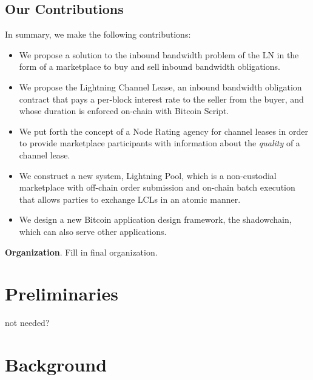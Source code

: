 \documentclass[10pt,a4paper]{article}
\theoremstyle{definition}
\begin{document}
\subsection{Our Contributions}

In summary, we make the following contributions: 

\begin{itemize} 
    \item We propose a solution to the inbound bandwidth problem of the LN in
        the form of a marketplace to buy and sell inbound bandwidth
        obligations.

    \item We propose the Lightning Channel Lease, an inbound bandwidth
        obligation contract that pays a per-block interest rate to the seller
        from the buyer, and whose duration is enforced on-chain with Bitcoin
        Script.  

    \item We put forth the concept of a Node Rating agency for channel leases
        in order to provide marketplace participants with
        information about the \emph{quality} of a channel lease.  

    \item We construct a new system, Lightning Pool, which is a non-custodial
        marketplace with off-chain order submission and on-chain batch
        execution that allows parties to exchange LCLs in an atomic
        manner.  

    \item We design a new Bitcoin application design framework, the
        shadowchain, which can also serve other applications.  
\end{itemize}


 \textbf{Organization}. Fill in final organization.


\section{Preliminaries}

not needed?



\section{Background}
\end{document}
